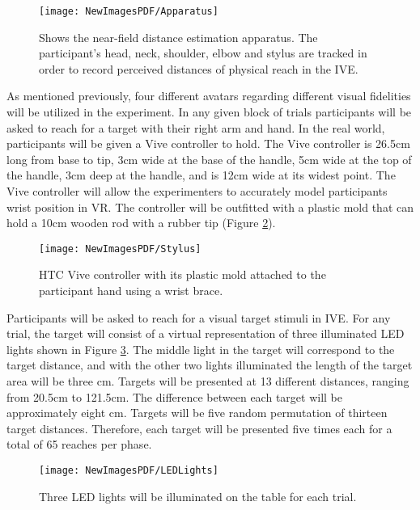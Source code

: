 \begin{figure}
	\centering
	\texttt{[image: NewImagesPDF/Apparatus]}
	\caption{Shows the near-field distance estimation apparatus. The participant's head, neck, shoulder, elbow and stylus are tracked in order to record perceived distances of physical reach in the IVE.}
	\label{fig:Self-Avtar_apparatus}
\end{figure}

As mentioned previously, four different avatars regarding different visual fidelities will be utilized in the experiment. In any given block of trials participants will be asked to reach for a target with their right arm and hand. In the real world, participants will be given a Vive controller to hold. The Vive controller is 26.5cm long from base to tip, 3cm wide at the base of the handle, 5cm wide at the top of the handle, 3cm deep at the handle, and is 12cm wide at its widest point. The Vive controller will allow the experimenters to accurately model participants wrist position in VR. The controller will be outfitted with a plastic mold that can hold a 10cm wooden rod with a rubber tip (Figure \ref{fig:Self_Avatar_Stylus}). 

\begin{figure}
	\centering
	\texttt{[image: NewImagesPDF/Stylus]}
	\caption{HTC Vive controller with its plastic mold attached to the participant hand using a wrist brace.}
	\label{fig:Self_Avatar_Stylus}
\end{figure}

Participants will be asked to reach for a visual target stimuli in IVE. For any trial, the target will consist of a virtual representation of three illuminated LED lights shown in Figure \ref{fig:LEDLights}. The middle light in the target will correspond to the target distance, and with the other two lights illuminated the length of the target area will be three cm. Targets will be presented at 13 different distances, ranging from 20.5cm to 121.5cm. The difference between each target will be approximately eight cm. Targets will be five random permutation of thirteen target distances. Therefore, each target will be presented five times each for a total of 65 reaches per phase. 

\begin{figure}
	\centering
	\texttt{[image: NewImagesPDF/LEDLights]}
	\caption{Three LED lights will be illuminated on the table for each trial.}
	\label{fig:LEDLights}
\end{figure}

